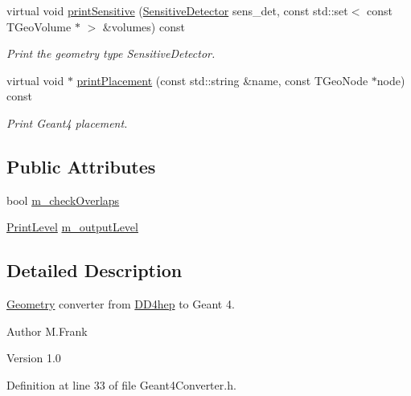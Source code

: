 \begin{DoxyCompactItemize}
virtual void \hyperlink{class_d_d4hep_1_1_simulation_1_1_geant4_converter_a0c4b85de4afdb9627b0adf76f033d4f5}{printSensitive} (\hyperlink{class_d_d4hep_1_1_geometry_1_1_sensitive_detector}{SensitiveDetector} sens\_\-det, const std::set$<$ const TGeoVolume $\ast$ $>$ \&volumes) const 
\begin{DoxyCompactList}\small\item\em Print the geometry type SensitiveDetector. \item\end{DoxyCompactList}\item 
virtual void $\ast$ \hyperlink{class_d_d4hep_1_1_simulation_1_1_geant4_converter_a4a2bbac335aeb3926bf3eb2c62803f74}{printPlacement} (const std::string \&name, const TGeoNode $\ast$node) const 
\begin{DoxyCompactList}\small\item\em Print Geant4 placement. \item\end{DoxyCompactList}\end{DoxyCompactItemize}
\subsection*{Public Attributes}
\begin{DoxyCompactItemize}
\item 
bool \hyperlink{class_d_d4hep_1_1_simulation_1_1_geant4_converter_a5afb918294afbed48b9c713f750fb017}{m\_\-checkOverlaps}
\item 
\hyperlink{namespace_d_d4hep_a5b5a64d56252469451f2020a27d57d42}{PrintLevel} \hyperlink{class_d_d4hep_1_1_simulation_1_1_geant4_converter_a0beb45875a3be411994a235aa545dbbc}{m\_\-outputLevel}
\end{DoxyCompactItemize}


\subsection{Detailed Description}
\hyperlink{namespace_d_d4hep_1_1_geometry}{Geometry} converter from \hyperlink{namespace_d_d4hep}{DD4hep} to Geant 4. \begin{DoxyAuthor}{Author}
M.Frank 
\end{DoxyAuthor}
\begin{DoxyVersion}{Version}
1.0 
\end{DoxyVersion}


Definition at line 33 of file Geant4Converter.h.

